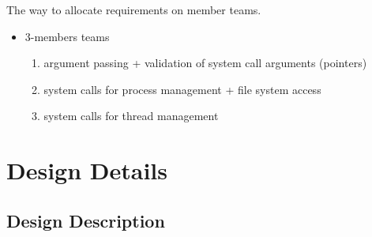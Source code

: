 The way to allocate requirements on member teams. 
\begin{itemize}
    \item 3-members teams
        \begin{enumerate}
            \item argument passing + validation of system call arguments (pointers)
            
            \item system calls for process management + file system access
            
            \item system calls for thread management
            
        \end{enumerate}

            
            
            


\end{itemize}

\section{Design Details}

\subsection{Design Description}

